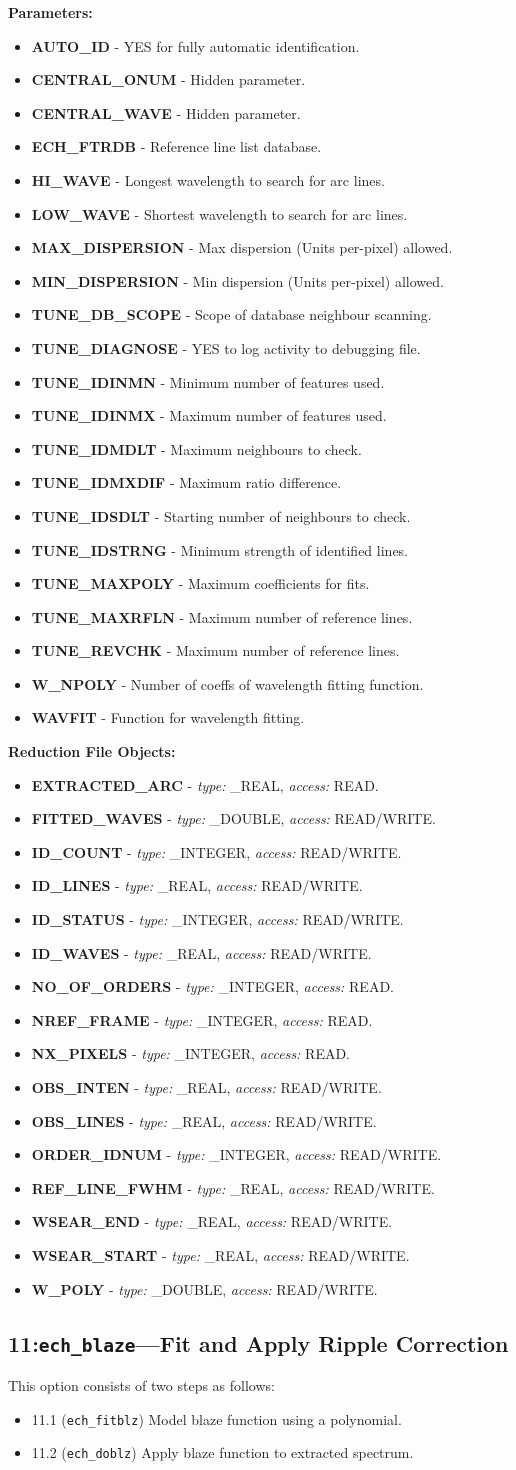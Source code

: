 \documentclass[11pt,twoside]{article}
\makeatletter
\newcommand{\stardocinitials}  {SUN}
\newcommand{\stardocnumber}    {152.4}
\newcommand{\stardocname}{\stardocinitials /\stardocnumber}
\newcommand{\htmlref}[2]{#1}
\newcommand{\xlabel}[1]{}
\newcommand{\mlabel}[1]{\xlabel{#1}\label{#1}}
\newcommand{\myindex}[1]{\index{#1}}
\renewcommand{\myindex}[1]{}
\newcommand{\cmdname}{\begingroup \catcode`\_=12 \realcmdname}
\newcommand{\realcmdname}[1]{\endgroup\texttt{#1}}
\newlength{\sstbannerlength}
\newlength{\sstcaptionlength}
\newcommand{\echtask}[4]{
   \goodbreak
   \rule{\textwidth}{0.5mm}
   \vspace{-7ex}
   \newline
   \settowidth{\sstbannerlength}{{\Large {\bf #3}}}
   \setlength{\sstcaptionlength}{\textwidth}
   \addtolength{\sstbannerlength}{0.5em}
   \addtolength{\sstcaptionlength}{-2.0\sstbannerlength}
   \addtolength{\sstcaptionlength}{-5.0pt}
   \parbox[t]{\sstbannerlength}{\flushleft{\Large {\bf #3}}}
   \parbox[t]{\sstcaptionlength}{\center{\Large #4}}
   \parbox[t]{\sstbannerlength}{\flushright{\Large {\bf #3}}}
   \label{#1}\label{#2}
   \markboth{#3}{\stardocname}
   \uppercase{\myindex{#2@\protect\cmdname{#2}}}
}
\renewcommand{\echtask}[4]
{
  \subsection{\xlabel{#1}\xlabel{#2}\label{#1}\label{#2}#3---#4}
  \markboth{#3}{\stardocname}
}
\newcommand{\echpars}[1]{
{\bf Parameters:\vspace*{6pt}\\}
    #1
}
\renewcommand{\echpars}[1]{
{\bf Parameters:}
\begin{itemize}
#1
\end{itemize}
}
\newcommand{\epar}[3]
{
    \hspace*{5mm}\makebox[50mm][l]{\bf #1} #2 (p~\pageref{par_#3}.)\\
}
\renewcommand{\epar}[3]
{\item \htmlref{{\bf #1}}{par_#3} - #2}
\newcommand{\lepar}[3]
{
    \hspace*{5mm}\makebox[50mm][l]{\bf #1} #2 (p~\pageref{par_#3}.)
}
\renewcommand{\lepar}[3]
{\item \htmlref{{\bf #1}}{par_#3} - #2}
\newcommand{\echredobj}[1]{
{\bf Reduction File Objects:\vspace*{6pt}\\}
      \hspace*{5mm}\makebox[50mm][l]{Object}\makebox[25mm][l]{Type}{Access}\\
      #1
}
\renewcommand{\echredobj}[1]{
{\bf Reduction File Objects:}
\begin{itemize}
#1
\end{itemize}
}
\newcommand{\eobj}[3]
{
    \hspace*{5mm}\makebox[50mm][l]{\bf #1}\makebox[25mm][l]{\tt #2}{\tt #3}\\
}
\renewcommand{\eobj}[3]
{\item {\bf #1} - {\it type:} #2, {\it access:} #3.}
\newcommand{\leobj}[3]
{
    \hspace*{5mm}\makebox[50mm][l]{\bf #1}\makebox[25mm][l]{\tt #2}{\tt #3}
}
\renewcommand{\leobj}[3]
{\item {\bf #1} - {\it type:} #2, {\it access:} #3.}
\makeatother
\begin{document}
\echpars{
\epar{AUTO\_ID}{YES for fully automatic identification.}{AUTO_ID}
\epar{CENTRAL\_ONUM}{Hidden parameter.}{CENTRAL_ONUM}
\epar{CENTRAL\_WAVE}{Hidden parameter.}{CENTRAL_WAVE}
\epar{ECH\_FTRDB}{Reference line list database.}{ECH_FTRDB}
\epar{HI\_WAVE}{Longest wavelength to search for arc lines.}{HI_WAVE}
\epar{LOW\_WAVE}{Shortest wavelength to search for arc lines.}{LOW_WAVE}
\epar{MAX\_DISPERSION}{Max dispersion (Units per-pixel) allowed.}{MAX_DISPERSION}
\epar{MIN\_DISPERSION}{Min dispersion (Units per-pixel) allowed.}{MIN_DISPERSION}
\epar{TUNE\_DB\_SCOPE}{Scope of database neighbour scanning.}{TUNE_DB_SCOPE}
\epar{TUNE\_DIAGNOSE}{YES to log activity to debugging file.}{TUNE_DIAGNOSE}
\epar{TUNE\_IDINMN}{Minimum number of features used.}{TUNE_IDINMN}
\epar{TUNE\_IDINMX}{Maximum number of features used.}{TUNE_IDINMX}
\epar{TUNE\_IDMDLT}{Maximum neighbours to check.}{TUNE_IDMDLT}
\epar{TUNE\_IDMXDIF}{Maximum ratio difference.}{TUNE_IDMXDIF}
\epar{TUNE\_IDSDLT}{Starting number of neighbours to check.}{TUNE_IDSDLT}
\epar{TUNE\_IDSTRNG}{Minimum strength of identified lines.}{TUNE_IDSTRNG}
\epar{TUNE\_MAXPOLY}{Maximum coefficients for fits.}{TUNE_MAXPOLY}
\epar{TUNE\_MAXRFLN}{Maximum number of reference lines.}{TUNE_MAXRFLN}
\epar{TUNE\_REVCHK}{Maximum number of reference lines.}{TUNE_REVCHK}
\epar{W\_NPOLY}{Number of coeffs of wavelength fitting function.}{W_NPOLY}
\lepar{WAVFIT}{Function for wavelength fitting.}{WAVFIT}
}


\echredobj{
\eobj{EXTRACTED\_ARC}{\_REAL}{READ}
\eobj{FITTED\_WAVES}{\_DOUBLE}{READ/WRITE}
\eobj{ID\_COUNT}{\_INTEGER}{READ/WRITE}
\eobj{ID\_LINES}{\_REAL}{READ/WRITE}
\eobj{ID\_STATUS}{\_INTEGER}{READ/WRITE}
\eobj{ID\_WAVES}{\_REAL}{READ/WRITE}
\eobj{NO\_OF\_ORDERS}{\_INTEGER}{READ}
\eobj{NREF\_FRAME}{\_INTEGER}{READ}
\eobj{NX\_PIXELS}{\_INTEGER}{READ}
\eobj{OBS\_INTEN}{\_REAL}{READ/WRITE}
\eobj{OBS\_LINES}{\_REAL}{READ/WRITE}
\eobj{ORDER\_IDNUM}{\_INTEGER}{READ/WRITE}
\eobj{REF\_LINE\_FWHM}{\_REAL}{READ/WRITE}
\eobj{WSEAR\_END}{\_REAL}{READ/WRITE}
\eobj{WSEAR\_START}{\_REAL}{READ/WRITE}
\leobj{W\_POLY}{\_DOUBLE}{READ/WRITE}
}


\echtask{option11}{ech_blaze}{11:{\tt ech\_blaze}}{Fit and Apply Ripple
  Correction}
\myindex{Order!blaze}
\myindex{Ripple correction}

This option consists of two steps as follows:

\begin{itemize}

\item \mlabel{ech_fitblz} {11.1} ({\tt{ech\_fitblz}})
      Model blaze function using a polynomial.

\item \mlabel{ech_doblz} {11.2} ({\tt{ech\_doblz}})
      Apply blaze function to extracted spectrum.

\end{itemize}
\end{document}
